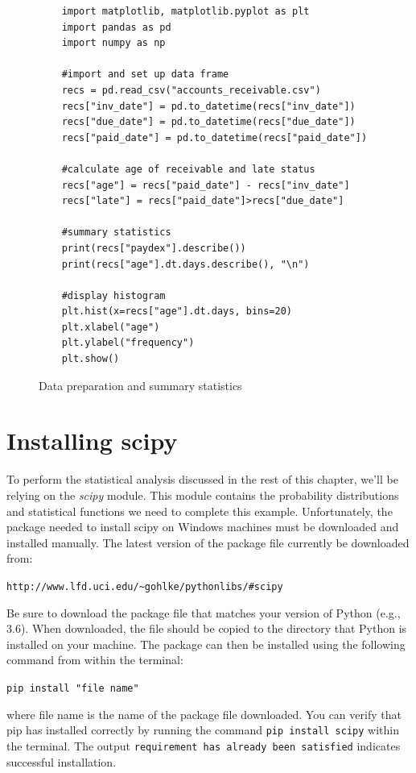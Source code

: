 \documentclass{book}
\begin{document}
\begin{figure}[h]
\caption{Data preparation and summary statistics}
\begin{lstlisting}
	import matplotlib, matplotlib.pyplot as plt
	import pandas as pd
	import numpy as np

	#import and set up data frame
	recs = pd.read_csv("accounts_receivable.csv")
	recs["inv_date"] = pd.to_datetime(recs["inv_date"])
	recs["due_date"] = pd.to_datetime(recs["due_date"])
	recs["paid_date"] = pd.to_datetime(recs["paid_date"])

	#calculate age of receivable and late status
	recs["age"] = recs["paid_date"] - recs["inv_date"]
	recs["late"] = recs["paid_date"]>recs["due_date"]

	#summary statistics
	print(recs["paydex"].describe())
	print(recs["age"].dt.days.describe(), "\n")

	#display histogram
	plt.hist(x=recs["age"].dt.days, bins=20)
	plt.xlabel("age")
	plt.ylabel("frequency")
	plt.show()
\end{lstlisting}
\end{figure}

\section{Installing scipy}

To perform the statistical analysis discussed in the rest of this chapter, we'll be relying on the \textit{scipy} module. This module contains the probability distributions and statistical functions we need to complete this example. Unfortunately, the package needed to install scipy on Windows machines must be downloaded and installed manually. The latest version of the package file currently be downloaded from:

\texttt{http://www.lfd.uci.edu/\textasciitilde gohlke/pythonlibs/\#scipy}

Be sure to download the package file that matches your version of Python (e.g., 3.6). When downloaded, the file should be copied to the directory that Python is installed on your machine. The package can then be installed using the following command from within the terminal: 

\texttt{pip install "file name"}

where file name is the name of the package file downloaded. You can verify that pip has installed correctly by running the command \texttt{pip install scipy} within the terminal. The output \texttt{requirement has already been satisfied} indicates successful installation.
\end{document}
